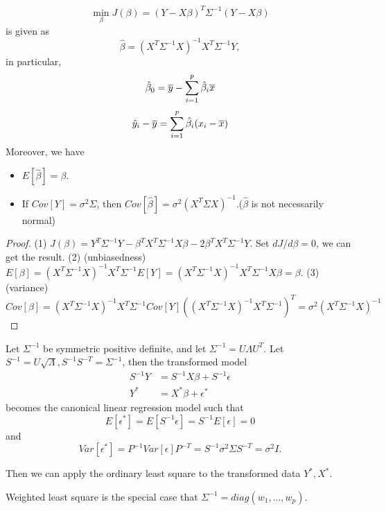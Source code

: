 \begin{refsection}
\begin{theorem}
	$$\min_\beta J(\beta) = (Y-X\beta)^T\Sigma^{-1}(Y - X\beta)$$
	is given as
	$$\hat{\beta} = (X^T\Sigma^{-1}X)^{-1}X^T\Sigma^{-1}Y,$$
	in particular, $$\hat{\beta}_0 = \overline{y} - \sum_{i=1}^p \hat{\beta}_i \overline{x}$$
	$$\hat{y}_i - \overline{y} =\sum_{i=1}^p \hat{\beta}_i (x_i-\overline{x}) $$
	Moreover, we have
	\begin{itemize}
		\item $E[\hat{\beta}] = \beta$.
		\item If $Cov[Y] = \sigma^2\Sigma$, then $Cov[\hat{\beta}] = \sigma^2(X^T\Sigma X)^{-1}$.($\hat{\beta}$ is not necessarily normal)
	\end{itemize}
\end{theorem}
\begin{proof}
	(1) $J(\beta) = Y^T\Sigma^{-1}Y - \beta^TX^T\Sigma^{-1}X\beta - 2\beta^TX^T\Sigma^{-1}Y$. Set $dJ/d\beta = 0$, we can get the result.
	(2) (unbiasedness) $E[\beta] = (X^T\Sigma^{-1}X)^{-1}X^T\Sigma^{-1} E[Y] = (X^T\Sigma^{-1}X)^{-1}X^T\Sigma^{-1}X\beta = \beta.$
	(3) (variance) $Cov[\beta] = (X^T\Sigma^{-1}X)^{-1}X^T\Sigma^{-1}Cov[Y]((X^T\Sigma^{-1}X)^{-1}X^T\Sigma^{-1})^T = \sigma^2(X^T\Sigma^{-1}X)^{-1}$
\end{proof}


\begin{note}
	Let $\Sigma^{-1}$ be symmetric positive definite, and let $\Sigma^{-1} = U\Lambda U^T$. Let $S^{-1} = U\sqrt{\Lambda}, S^{-1}S^{-T}=\Sigma^{-1}$, then the transformed model
	\begin{align*}
	S^{-1}Y &= S^{-1}X\beta + S^{-1}\epsilon \\
	Y^* &= X^*\beta + \epsilon^*
	\end{align*}
	becomes the canonical linear regression model such that
	$$E[\epsilon^*] = E[S^{-1}\epsilon] = S^{-1}E[\epsilon] = 0$$
	and
	$$Var[\epsilon^*] = P^{-1}Var[\epsilon]P^{-T} = S^{-1}\sigma^2 \Sigma S^{-T} = \sigma^2 I.$$
	
	Then we can apply the ordinary least square to the transformed data $Y^*,X^*$.
\end{note}


\begin{remark}
	Weighted least square is the special case that $\Sigma^{-1}=diag(w_1,...,w_p)$.
\end{remark}




\end{refsection}

